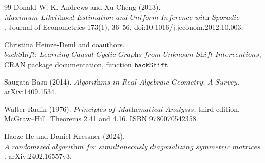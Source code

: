 \documentclass{article}
\begin{document}
\begin{thebibliography}{99}
   Donald W. K. Andrews and Xu Cheng (2013). \(\textit{Maximum Likelihood Estimation and Uniform Inference with Sporadic Identification Failure}\). Journal of Econometrics 173(1), 36--56. doi:10.1016/j.jeconom.2012.10.003.

   Christina Heinze-Deml and coauthors. \(\textit{backShift: Learning Causal Cyclic Graphs from Unknown Shift Interventions}\), CRAN package documentation, function \(\texttt{backShift}\).

   Saugata Basu (2014). \(\textit{Algorithms in Real Algebraic Geometry: A Survey}\). arXiv:1409.1534.

   Walter Rudin (1976). \(\textit{Principles of Mathematical Analysis}\), third edition. McGraw--Hill. Theorems 2.41 and 4.16. ISBN 9780070542358.

   Haoze He and Daniel Kressner (2024). \(\textit{A randomized algorithm for simultaneously diagonalizing symmetric matrices by congruence}\). arXiv:2402.16557v3.

\end{thebibliography}
\end{document}

